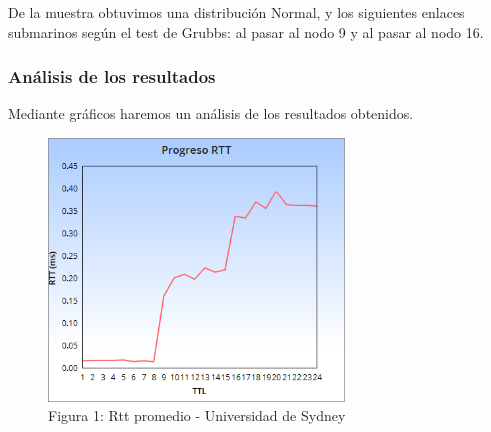 

De la muestra obtuvimos una distribuci\'on Normal, y los siguientes enlaces submarinos seg\'un el test de Grubbs: al pasar al nodo 9 y al pasar al nodo 16.\newline

\subsubsection{An\'alisis de los resultados}
Mediante gr\'aficos haremos un an\'alisis de los resultados obtenidos. \newline


\begin{figure}[h]
	\begin{center}
    \includegraphics[width=0.7\textwidth]{img_analisis2/RTTprom.png} 
	\caption{Figura 1: Rtt promedio - Universidad de Sydney}	
	\end{center} 
	
    
\end{figure}



